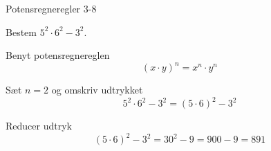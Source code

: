 \documentclass{article}
\begin{document}
\newpage

\begin{exercise}{Potensregneregler 3-8}

Bestem $5^2 \cdot 6^2 - 3^2$.


\hint

Benyt potensregnereglen
\[
(x \cdot y)^n = x^n \cdot y^n
\]

\hint

Sæt $n=2$ og omskriv udtrykket
\[
5^2 \cdot 6^2 - 3^2 = (5 \cdot 6)^2 - 3^2
\]

\hint

Reducer udtryk
\[
(5 \cdot 6)^2 - 3^2 = 30^2 - 9 = 900 - 9 = 891
\]


\end{exercise}
\end{document}
